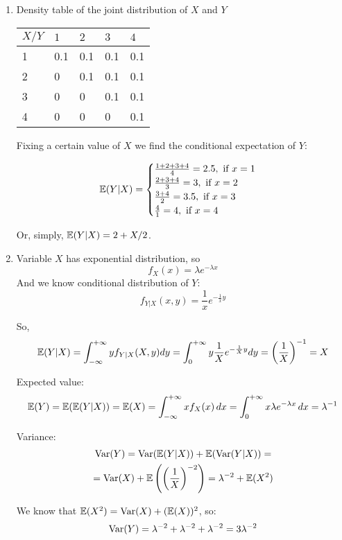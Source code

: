 \documentclass[12pt, a4paper]{article}
\begin{document}
\begin{enumerate}
\item Density table of the joint distribution of $X$ and $Y$
\begin{table}[h!]
\centering
\label{tab:discrete_eyx}
\begin{tabular}{lllll}
\toprule
$X/Y$ & $1$ & $2$ & $3$ & $4$\\
\midrule
1& 0.1 & 0.1 & 0.1 & 0.1 \\
2& 0 & 0.1 & 0.1 & 0.1 \\
3& 0 & 0 & 0.1 & 0.1 \\
4& 0 & 0 & 0 & 0.1 \\
\bottomrule
\end{tabular}
\end{table}

Fixing a certain value of $X$ we find the conditional expectation of $Y$:

\[
\mathbb{E}(Y|X) =
\begin{cases}
  \frac{1+2+3+4}{4} = 2.5, \text{ if }  x=1\\
  \frac{2+3+4}{3} = 3, \text{ if } x=2\\
  \frac{3+4}{2} = 3.5, \text{ if } x=3\\
  \frac{4}{1} = 4, \text{ if }  x=4\\
\end{cases}
\]

Or, simply, $\mathbb{E}(Y|X)=2 + X/2$.

\item Variable $X$ has exponential distribution, so
\[
f_X(x)=\lambda e^{-\lambda x}
\]
And we know conditional distribution of $Y$:
\[
f_{Y|X}(x,y)=\frac{1}{x} e^{-\frac{1}{x}y}
\]

So,
\[
\mathbb{E}(Y|X) = \int _{-\infty}^{+\infty}  y { f_{Y|X}(X,y)} dy=  \int _{0}^{+\infty} y  \frac{1}{X} e^{-\frac{1}{X}y} dy =  \left( {\frac{1}{X} }\right) ^{-1} = X
\]


Expected value:
\[
\mathbb{E}(Y) =\mathbb{E}(\mathbb{E}(Y|X)) =\mathbb{E}(X) =  \int _{-\infty}^{+\infty}x f_X(x) \, dx=  \int _{0}^{+\infty} x \lambda e^{-\lambda x} \, dx =\lambda^{-1}
\]

Variance:
\begin{multline*}
\operatorname{Var}(Y) =\operatorname{Var}(\mathbb{E}(Y|X))+ \mathbb{E}( \operatorname{Var}(Y|X)) = \\
= \operatorname{Var}(X)+ \mathbb{E} \left( \left({\frac{1}{X} }\right) ^{-2}\right)=
\lambda^{-2}+  \mathbb{E} (X^2)
\end{multline*}

We know that $ \mathbb{E} (X^2) = \operatorname{Var}(X) + (\mathbb{E}(X))^2$, so:
\[
\operatorname{Var}(Y) = \lambda^{-2}+\lambda^{-2} + \lambda^{-2} = 3\lambda^{-2}
\]


\end{enumerate}
\end{document}
